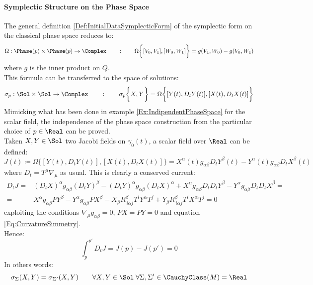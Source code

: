 \documentclass[Main]{subfiles}
\begin{document}
			\paragraph{Symplectic Structure on the Phase Space}		
				The general definition \ref{Def:InitialDataSymplecticForm} of the symplectic form on the classical phase space reduces to:
				\begin{displaymath}
					\Omega: \Phase(p) \times \Phase(p) \rightarrow \Complex \qquad : \qquad 					
					\Omega \biggr\{ [V_0,V_1] , [W_0, W_1] \biggr\} = g(V_1,W_0)  - g( V_0, W_1) 
				\end{displaymath}
				where $g$ is the inner product on $Q$.
				\\
				This formula can be transferred to the space of solutions:
				\begin{displaymath}
					\sigma_p: \Sol \times \Sol \rightarrow \Complex \qquad : \qquad 					
					\sigma_p \biggr\{X, Y  \biggr\} = \Omega \biggr\{ [Y(t), D_t Y(t)] , [X(t), D_t X(t)] \biggr\}
				\end{displaymath}
				\vspace{3mm}
				Mimicking what has been done in example \ref{Ex:IndipendentPhaseSpace} for the scalar field, the independence of the phase space construction from the particular choice of $p \in \Real$ can be proved.\\
				Taken $X,Y \in \Sol$ two Jacobi fields on $\gamma_0(t)$, a scalar field over $\Real$ can be defined:
				\begin{displaymath}
					J(t) \coloneqq \Omega \biggr\{ [Y(t), D_t Y(t)] , [X(t), D_t X(t)] \biggr\}
					= X^\alpha(t) g_{\alpha \beta} D_t Y^\beta(t) - 
					Y^\alpha(t) g_{\alpha \beta} D_t X^\beta(t) 					
				\end{displaymath}
				where $D_t = T^\mu \nabla_\mu$ as usual.
				This is clearly a conserved current:
				\begin{eqnarray}
					D_t J =& (D_t X)^\alpha g_{\alpha \beta} (D_t Y)^\beta - (D_t Y)^\alpha g_{\alpha \beta} (D_t X)^\alpha + X^\alpha g_{\alpha \beta} D_t D_t Y^\beta - Y^\alpha g_{\alpha \beta} D_t D_t X^\beta = \nonumber \\
					=& X^\alpha g_{\alpha \beta} PY^\beta - Y^\alpha g_{\alpha \beta} PX^\beta - X_\beta R^\beta _{\, i \alpha j}T^i Y^\alpha T^j +Y_\beta R^\beta _{\, i \alpha j}T^i X^\alpha T^j  = 0
				\end{eqnarray}
				exploiting the conditions $\nabla_\mu g_{\alpha \beta}=0$, $PX=PY=0$ and equation \ref{Eq:CurvatureSimmetry}.\\
				Hence:
				\begin{displaymath}
				\int_p^{p'} D_t J = J(p) - J(p') = 0
				\end{displaymath}
			In others words:
			\begin{displaymath}
				\sigma_\Sigma (X, Y) = \sigma_{\Sigma'} (X, Y) 
				\qquad \forall X, Y \in \Sol \; \forall \Sigma, \Sigma' \in \CauchyClass(M)= \Real
			\end{displaymath}
			
\end{document}
